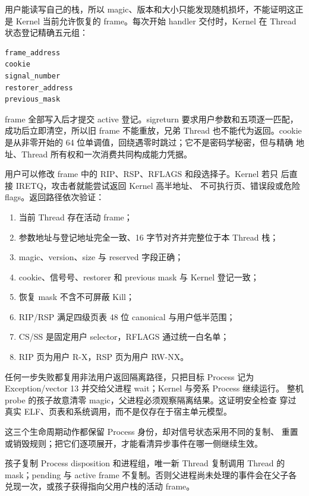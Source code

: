 用户能读写自己的栈，所以 magic、版本和大小只能发现随机损坏，不能证明这正是
Kernel 当前允许恢复的 frame。每次开始 handler 交付时，Kernel 在 Thread
状态登记精确五元组：

\begin{lstlisting}
frame_address
cookie
signal_number
restorer_address
previous_mask
\end{lstlisting}

frame 全部写入后才提交 active 登记。sigreturn 要求用户参数和五项逐一匹配，
成功后立即清空，所以旧 frame 不能重放，兄弟 Thread 也不能代为返回。cookie
是从非零开始的 64 位单调值，回绕遇零时跳过；它不是密码学秘密，但与精确
地址、Thread 所有权和一次消费共同构成能力凭据。

用户可以修改 frame 中的 RIP、RSP、RFLAGS 和段选择子。Kernel 若只
 后直接 IRETQ，攻击者就能尝试返回 Kernel 高半地址、
不可执行页、错误段或危险 flags。返回路径依次验证：

\begin{enumerate}
  \item 当前 Thread 存在活动 frame；
  \item 参数地址与登记地址完全一致、16 字节对齐并完整位于本 Thread 栈；
  \item magic、version、size 与 reserved 字段正确；
  \item cookie、信号号、restorer 和 previous mask 与 Kernel 登记一致；
  \item 恢复 mask 不含不可屏蔽 Kill；
  \item RIP/RSP 满足四级页表 48 位 canonical 与用户低半范围；
  \item CS/SS 是固定用户 selector，RFLAGS 通过统一白名单；
  \item RIP 页为用户 R-X，RSP 页为用户 RW-NX。
\end{enumerate}

任何一步失败都复用非法用户返回隔离路径，只把目标 Process 记为
Exception/vector 13 并交给父进程 wait；Kernel 与旁系 Process 继续运行。
整机 probe 的孩子故意清零 magic，父进程必须观察隔离结果。这证明安全检查
穿过真实 ELF、页表和系统调用，而不是仅存在于宿主单元模型。

这三个生命周期动作都保留 Process 身份，却对信号状态采用不同的复制、
重置或销毁规则；把它们逐项展开，才能看清异步事件在哪一侧继续生效。

孩子复制 Process disposition 和进程组，唯一新 Thread 复制调用 Thread 的
mask；pending 与 active frame 不复制。否则父进程尚未处理的事件会在父子各
兑现一次，或孩子获得指向父用户栈的活动 frame。

